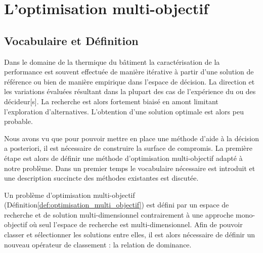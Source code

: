 


\section{L’optimisation multi-objectif} %
\label{sec:l_optimisation_multi_objectif}
\subsection{Vocabulaire et Définition} %
\label{sub:vocabulaire_et_definition}
Dans le domaine de la thermique du bâtiment la caractérisation
de la performance est souvent effectuée de manière itérative à partir d’une solution
de référence ou bien de manière empirique dans l’espace de décision. La direction et
les variations évaluées résultant dans la plupart des cas de l’expérience du ou des
décideur[s]. La recherche est alors fortement biaisé en amont limitant l’exploration
d’alternatives. L’obtention d’une solution optimale est alors peu probable.

Nous avons vu que pour pouvoir mettre en place une méthode d’aide à la décision a posteriori, il
est nécessaire de construire la surface de compromis. La première étape est alors
de définir une méthode d’optimisation multi-objectif adapté à notre problème.
Dans un premier temps le vocabulaire nécessaire est introduit et une
description succincte des méthodes existantes est discutée.


Un problème d’optimisation multi-objectif (Définition\ref{def:optimisation_multi_objectif})
est défini par un espace de recherche et de solution multi-dimensionnel contrairement à
une approche mono-objectif où seul l’espace de recherche est multi-dimensionnel.
Afin de pouvoir classer et sélectionner les solutions entre elles, il est alors nécessaire de définir un
nouveau opérateur de classement : la relation de dominance.

